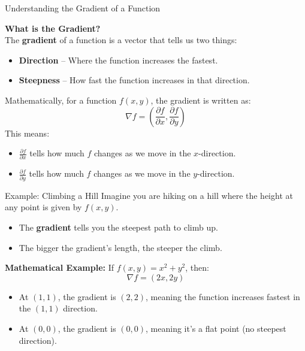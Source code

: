 \documentclass{beamer}
\def\lthtmlcheckvsize{\ifdim\ht\sizebox<\vsize 
  \ifdim\wd\sizebox<\hsize\expandafter\hfill\fi \expandafter\vfill
  \else\expandafter\vss\fi}%
\begin{document}
{\newpage\clearpage
{}%
\begin{frame}{Understanding the Gradient of a Function}
\par
\textbf{What is the Gradient?} \\
    The \textbf{gradient} of a function is a vector that tells us two things:
    \begin{itemize}
        \item \textbf{Direction} – Where the function increases the fastest.
        \item \textbf{Steepness} – How fast the function increases in that direction.
    \end{itemize}
\par
Mathematically, for a function \( f(x, y) \), the gradient is written as:
    \begin{displaymath}
    \nabla f = \left( \frac{\partial f}{\partial x}, \frac{\partial f}{\partial y} \right)
    \end{displaymath}
    This means:
    \begin{itemize}
        \item \( \frac{\partial f}{\partial x} \) tells how much \( f \) changes as we move in the \( x \)-direction.
        \item \( \frac{\partial f}{\partial y} \) tells how much \( f \) changes as we move in the \( y \)-direction.
    \end{itemize}
\par
\end{frame}%
\lthtmlfigureZ
\lthtmlcheckvsize\clearpage}

{\newpage\clearpage
{}%
\begin{frame}{Example: Climbing a Hill}
    Imagine you are hiking on a hill where the height at any point is given by \( f(x, y) \).
    \begin{itemize}
        \item The \textbf{gradient} tells you the steepest path to climb up.
        \item The bigger the gradient’s length, the steeper the climb.
    \end{itemize}
\par
\textbf{Mathematical Example:} If \( f(x, y) = x^2 + y^2 \), then:
    \begin{displaymath}
    \nabla f = (2x, 2y)
    \end{displaymath}
    \begin{itemize}
        \item At \( (1,1) \), the gradient is \( (2,2) \), meaning the function increases fastest in the \((1,1)\) direction.
        \item At \( (0,0) \), the gradient is \( (0,0) \), meaning it’s a flat point (no steepest direction).
    \end{itemize}
\par
\centering
\par
\end{frame}%
\lthtmlfigureZ
\lthtmlcheckvsize\clearpage}
\end{document}
